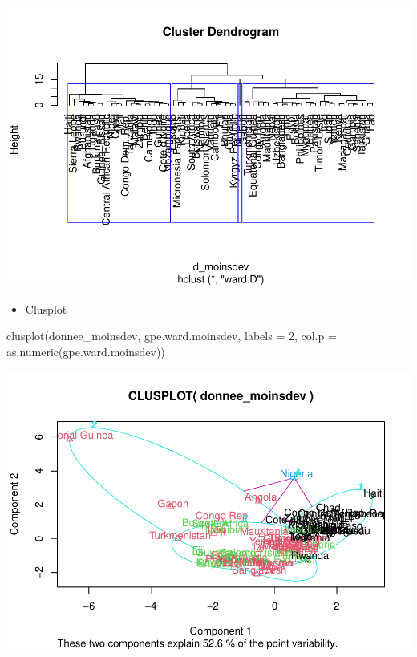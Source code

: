 \documentclass[
]{article}
\newenvironment{Shaded}{}{}
\newcommand{\AttributeTok}[1]{#1}
\newcommand{\DecValTok}[1]{#1}
\newcommand{\FunctionTok}[1]{#1}
\newcommand{\NormalTok}[1]{#1}
\providecommand{\tightlist}{%
  \setlength{\itemsep}{0pt}\setlength{\parskip}{0pt}}
\begin{document}
\includegraphics{Projet_files/figure-latex/unnamed-chunk-32-1.pdf}

\begin{itemize}
\tightlist
\item
  Clusplot
\end{itemize}

\begin{Shaded}
\begin{Highlighting}[]
\FunctionTok{clusplot}\NormalTok{(donnee\_moinsdev, gpe.ward.moinsdev, }\AttributeTok{labels =} \DecValTok{2}\NormalTok{, }\AttributeTok{col.p =} \FunctionTok{as.numeric}\NormalTok{(gpe.ward.moinsdev))}
\end{Highlighting}
\end{Shaded}

\includegraphics{Projet_files/figure-latex/unnamed-chunk-33-1.pdf}
\end{document}
